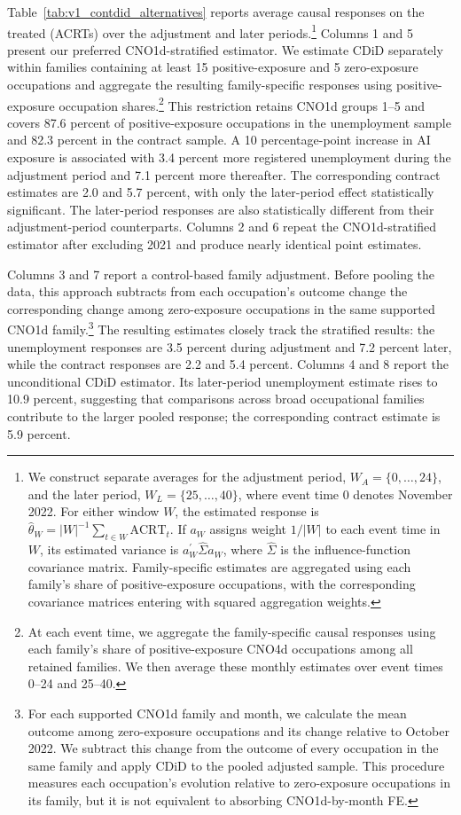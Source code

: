 Table~\ref{tab:v1_contdid_alternatives} reports average causal responses on the treated (ACRTs) over the adjustment and later periods.\footnote{We construct separate averages for the adjustment period, \(W_A=\{0,\ldots,24\}\), and the later period, \(W_L=\{25,\ldots,40\}\), where event time 0 denotes November 2022. For either window \(W\), the estimated response is \(\widehat{\theta}_{W}=|W|^{-1}\sum_{t\in W}\widehat{\mathrm{ACRT}}_{t}\). If \(a_W\) assigns weight \(1/|W|\) to each event time in \(W\), its estimated variance is \(a_W^{\prime}\widehat{\Sigma}a_W\), where \(\widehat{\Sigma}\) is the influence-function covariance matrix. Family-specific estimates are aggregated using each family's share of positive-exposure occupations, with the corresponding covariance matrices entering with squared aggregation weights.} Columns 1 and 5 present our preferred CNO1d-stratified estimator. We estimate CDiD separately within families containing at least 15 positive-exposure and 5 zero-exposure occupations and aggregate the resulting family-specific responses using positive-exposure occupation shares.\footnote{At each event time, we aggregate the family-specific causal responses using each family's share of positive-exposure CNO4d occupations among all retained families. We then average these monthly estimates over event times 0--24 and 25--40.} This restriction retains CNO1d groups 1--5 and covers 87.6 percent of positive-exposure occupations in the unemployment sample and 82.3 percent in the contract sample. A 10 percentage-point increase in AI exposure is associated with 3.4 percent more registered unemployment during the adjustment period and 7.1 percent more thereafter. The corresponding contract estimates are 2.0 and 5.7 percent, with only the later-period effect statistically significant. The later-period responses are also statistically different from their adjustment-period counterparts. Columns 2 and 6 repeat the CNO1d-stratified estimator after excluding 2021 and produce nearly identical point estimates.

Columns 3 and 7 report a control-based family adjustment. Before pooling the data, this approach subtracts from each occupation's outcome change the corresponding change among zero-exposure occupations in the same supported CNO1d family.\footnote{For each supported CNO1d family and month, we calculate the mean outcome among zero-exposure occupations and its change relative to October 2022. We subtract this change from the outcome of every occupation in the same family and apply CDiD to the pooled adjusted sample. This procedure measures each occupation's evolution relative to zero-exposure occupations in its family, but it is not equivalent to absorbing CNO1d-by-month FE.} The resulting estimates closely track the stratified results: the unemployment responses are 3.5 percent during adjustment and 7.2 percent later, while the contract responses are 2.2 and 5.4 percent. Columns 4 and 8 report the unconditional CDiD estimator. Its later-period unemployment estimate rises to 10.9 percent, suggesting that comparisons across broad occupational families contribute to the larger pooled response; the corresponding contract estimate is 5.9 percent.

